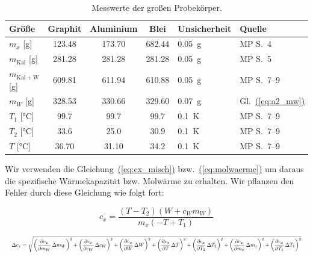 \documentclass{article}
\let\OrigRef\ref
\renewcommand{\ref}[1]{{\color{linkblue}\uline{\OrigRef{#1}}}}
\renewcommand{\eqref}[1]{{\color{linkblue}\uline{\textup{(\OrigRef{#1})}}}}
\begin{document}
\begin{table}[H]
	\centering
	\begin{tabular}{lSSSll}
		\toprule
		Größe & {Graphit} & {Aluminium} & {Blei} & Unsicherheit & Quelle \\
		\midrule
		$m_x$ [\unit{\gram}] & 123.48 & 173.70 & 682.44 & \qty{0.05}{\gram} & MP S.~4 \\
		$m_\mathrm{Kal}$ [\unit{\gram}] & 281.28 & 281.28 & 281.28 & \qty{0.05}{\gram} & MP S.~5 \\
		$m_\mathrm{Kal+W}$ [\unit{\gram}] & 609.81 & 611.94 & 610.88 & \qty{0.05}{\gram} & MP S.~7--9 \\
		$m_W$ [\unit{\gram}] & 328.53 & 330.66 & 329.60 & \qty{0.07}{\gram} & Gl.~\eqref{eq:a2_mw} \\
		$T_1$ [\unit{\degreeCelsius}] & 99.7 & 99.7 & 99.7 & \qty{0.1}{\kelvin} & MP S.~7--9 \\
		$T_2$ [\unit{\degreeCelsius}] & 33.6 & 25.0 & 30.9 & \qty{0.1}{\kelvin} & MP S.~7--9 \\
		$T$ [\unit{\degreeCelsius}] & 36.70 & 31.10 & 34.2 & \qty{0.1}{\kelvin} & MP S.~7--9 \\
		\bottomrule
	\end{tabular}
	\caption{Messwerte der großen Probekörper.}
	\label{tab:a2_messwerte}
\end{table}

Wir verwenden die Gleichung~\eqref{eq:cx_misch} bzw.~\eqref{eq:molwaerme} um daraus die spezifische Wärmekapazität bzw.
Molwärme zu erhalten. Wir pflanzen den Fehler durch diese Gleichung wie folgt fort:

  \begin{equation} c_x = \frac{\left(T - T_{2}\right) \left(W + c_{W} m_{W}\right)}{m_{x} \left(- T + T_{1}\right)} \end{equation}

  \begin{equation}
	\resizebox{\textwidth}{!}{$\displaystyle
	\Delta c_x = \sqrt{\left(\frac{\partial c_x}{\partial m_{W}}\,\Delta m_{W}\right)^2 + \left(\frac{\partial c_x}{\partial c_{W}}\,\Delta c_{W}\right)^2 + \left(\frac{\partial c_x}{\partial W}\,\Delta W\right)^2 + \left(\frac{\partial c_x}{\partial T}\,\Delta T\right)^2 + \left(\frac{\partial c_x}{\partial T_{2}}\,\Delta T_{2}\right)^2 + \left(\frac{\partial c_x}{\partial m_{x}}\,\Delta m_{x}\right)^2 + \left(\frac{\partial c_x}{\partial T_{1}}\,\Delta T_{1}\right)^2}
	$}
  \end{equation}
\end{document}
